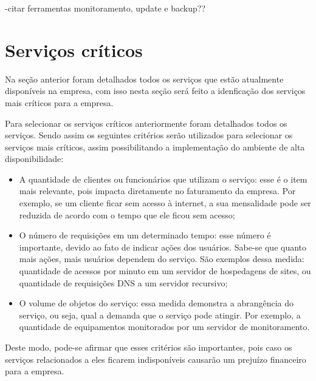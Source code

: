 -citar ferramentas monitoramento, update e backup??

\section{Serviços críticos}
\label{section:servcrit}

Na seção anterior foram detalhados todos os serviços que estão atualmente disponíveis na empresa, com isso nesta seção será feito a 
idenficação dos serviços mais críticos para a empresa.

Para selecionar os serviços críticos anteriormente foram detalhados todos os serviços. Sendo assim os seguintes critérios serão utilizados para
selecionar os serviços mais críticos, assim possibilitando a implementação do ambiente de alta disponibilidade: 
\begin{itemize}
 \item A quantidade de clientes ou funcionários que utilizam o serviço: esse é o item mais relevante, pois impacta diretamente no faturamento
 da empresa. Por exemplo, se um cliente ficar sem acesso à internet, a sua mensalidade pode ser reduzida de acordo com o tempo que ele ficou
 sem acesso; 
 \item O número de requisições em um determinado tempo: esse número é importante, devido ao fato de indicar ações dos usuários. Sabe-se que
 quanto mais ações, mais usuários dependem do serviço. São exemplos dessa medida: quantidade de acessos por minuto em um servidor de hospedagens 
 de sites, ou quantidade de requisições \ac{DNS} a um servidor recursivo;
 \item O volume de objetos do serviço: essa medida demonstra a abrangência do serviço, ou seja, qual a demanda que o serviço pode atingir.
 Por exemplo, a quantidade de equipamentos monitorados por um servidor de monitoramento.
\end{itemize}

Deste modo, pode-se afirmar que esses critérios são importantes, pois caso os serviços relacionados a eles ficarem indisponíveis causarão 
um prejuízo financeiro para a empresa. 

